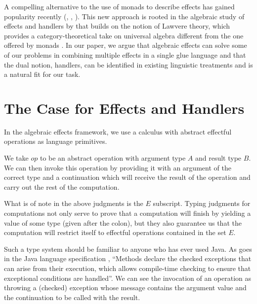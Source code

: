\documentclass{article}
\begin{document}
A compelling alternative to the use of monads to describe effects has gained
popularity recently (\citet{bauer2012programming}, \citet{kammar2013handlers},
\citet{kiselyov2013extensible}). This new approach is rooted in the algebraic
study of effects and handlers by \citet{plotkin2009handlers} that builds on
the notion of Lawvere theory, which provides a category-theoretical take on
universal algebra different from the one offered by monads
\citep{hyland2007category}. In our paper, we argue that algebraic effects can
solve some of our problems in combining multiple effects in a single glue
language and that the dual notion, handlers, can be identified in existing
linguistic treatments and is a natural fit for our task.


\section{The Case for Effects and Handlers}

In the algebraic effects framework, we use a calculus with abstract effectful
operations as language primitives. \citep{kammar2013handlers}

\begin{prooftree}
\end{prooftree}

We take $op$ to be an abstract operation with argument type $A$ and result
type $B$. We can then invoke this operation by providing it with an argument
of the correct type and a continuation which will receive the result of the
operation and carry out the rest of the computation.

What is of note in the above judgments is the $E$ subscript. Typing judgments
for computations not only serve to prove that a computation will finish by
yielding a value of some type (given after the colon), but they also guarantee
us that the computation will restrict itself to effectful operations contained
in the set $E$.

Such a type system should be familiar to anyone who has ever used Java. As
goes in the Java language specification \citep{gosling2000java}, ``Methods
declare the checked exceptions that can arise from their execution, which
allows compile-time checking to ensure that exceptional conditions are
handled''. We can see the invocation of an operation as throwing a (checked)
exception whose message contains the argument value and the continuation to be
called with the result.
\end{document}

